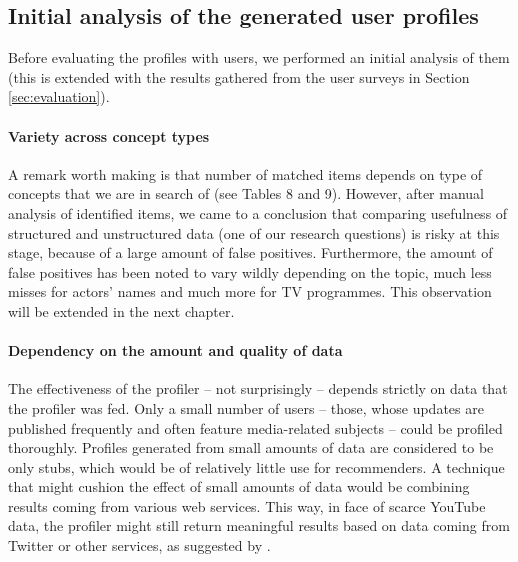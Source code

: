 \subsection{Initial analysis of the generated user profiles}

Before evaluating the profiles with users, we performed an initial analysis of
them (this is extended with the results gathered from the user surveys in
Section \ref{sec:evaluation}).

\paragraph{Variety across concept types}

A remark worth making is that number of matched items depends on type of
concepts that we are in search of (see Tables 8 and 9). However, after manual
analysis of identified items, we came to a conclusion that comparing usefulness
of structured and unstructured data (one of our research questions) is risky at
this stage, because of a large amount of false positives. Furthermore, the
amount of false positives has been noted to vary wildly depending on the topic, \ie
much less misses for actors' names and much more for TV programmes. This
observation will be extended in the next chapter.

\paragraph{Dependency on the amount and quality of data}

The effectiveness of the profiler -- not surprisingly -- depends strictly on data
that the profiler was fed. Only a small number of users -- those, whose updates
are published frequently and often feature media-related subjects -- could be
profiled thoroughly. Profiles generated from small amounts of data are considered
to be only stubs, which would be of relatively little use for recommenders. A technique that
might cushion the effect of small amounts of data would be combining results
coming from various web services. This way, in face of scarce YouTube data, the
profiler might still return meaningful results based on data coming from
Twitter or other services, as suggested by \cite{public-profiles}.
